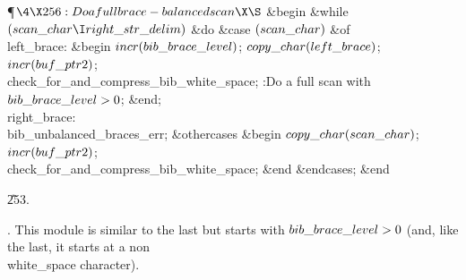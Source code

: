 \Y\P$\4\X256:Do a full brace-balanced scan\X\S$\6
\&{begin} \&{while} $(\\{scan\_char}\I\\{right\_str\_delim})$ \1\&{do}\6
\&{case} $(\\{scan\_char})$ \1\&{of}\6
\4\\{left\_brace}: \&{begin} $\\{incr}(\\{bib\_brace\_level})$;\5
$\\{copy\_char}(\\{left\_brace})$;\6
$\\{incr}(\\{buf\_ptr2})$;\6
\\{check\_for\_and\_compress\_bib\_white\_space};\6
:Do a full scan with $\\{bib\_brace\_level}>0$\X;\6
\&{end};\6
\4\\{right\_brace}: \\{bib\_unbalanced\_braces\_err};\6
\4\&{othercases} \&{begin} $\\{copy\_char}(\\{scan\_char})$;\5
$\\{incr}(\\{buf\_ptr2})$;\6
\\{check\_for\_and\_compress\_bib\_white\_space};\6
\&{end}\2\6
\&{endcases};\2\6
\&{end}\par
\U253.\fi

.
This module is similar to the last but starts with $\\{bib\_brace\_level}>0$
(and, like the last, it starts at a non\\{white\_space} character).

